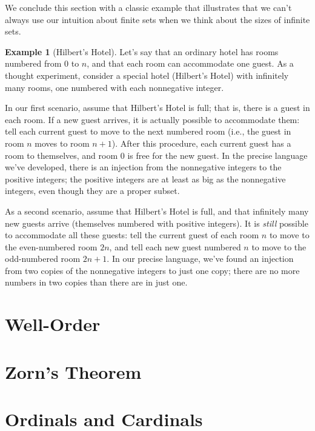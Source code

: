 \documentclass[letterpaper]{article}
\theoremstyle{definition}
\newtheorem{example}[theorem]{Example}
\begin{document}
We conclude this section with a classic example that illustrates that
we can't always use our intuition about finite sets when we think
about the sizes of infinite sets.
\begin{example}[Hilbert's Hotel]
  Let's say that an ordinary hotel has rooms numbered from 0 to \(n\),
  and that each room can accommodate one guest.  As a thought
  experiment, consider a special hotel (Hilbert's Hotel) with
  infinitely many rooms, one numbered with each nonnegative integer.

  In our first scenario, assume that Hilbert's Hotel is full; that is,
  there is a guest in each room.  If a new guest arrives, it is
  actually possible to accommodate them: tell each current guest to
  move to the next numbered room (i.e., the guest in room \(n\) moves
  to room \(n+1\)).  After this procedure, each current guest has a
  room to themselves, and room 0 is free for the new guest.  In the
  precise language we've developed, there is an injection from the
  nonnegative integers to the positive integers; the positive integers
  are at least as big as the nonnegative integers, even though they
  are a proper subset.

  As a second scenario, assume that Hilbert's Hotel is full, and that
  infinitely many new guests arrive (themselves numbered with positive
  integers).  It is \emph{still} possible to accommodate all these
  guests: tell the current guest of each room \(n\) to move to the
  even-numbered room \(2n\), and tell each new guest numbered \(n\) to
  move to the odd-numbered room \(2n+1\).  In our precise language,
  we've found an injection from two copies of the nonnegative integers
  to just one copy; there are no more numbers in two copies than there
  are in just one.
\end{example}

\section{Well-Order}

\section{Zorn's Theorem}

\section{Ordinals and Cardinals}
\end{document}
